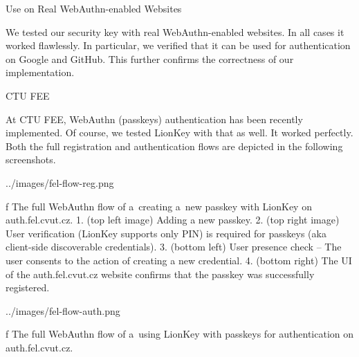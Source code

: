 \sec Use on Real WebAuthn-enabled Websites

We tested our security key with real WebAuthn-enabled websites. In all cases it worked flawlessly. In particular, we verified that it can be used for authentication on {\sbf Google} and {\sbf GitHub}. This further confirms the correctness of our implementation.


\secc CTU FEE

At CTU FEE, WebAuthn (passkeys) authentication has been recently implemented. Of course, we tested LionKey with that as well. It worked perfectly. Both the full registration and authentication flows are depicted in the following screenshots.

\midinsert
{}
\picw=144mm \cinspic ../images/fel-flow-reg.png
\caption/f The full WebAuthn flow of a~creating a~new passkey with LionKey on auth.fel.cvut.cz. 1. (top left image) Adding a new passkey. 2. (top right image) User verification (LionKey supports only PIN) is required for passkeys (aka client-side discoverable credentials). 3. (bottom left) User presence check – The user consents to the action of creating a new credential. 4. (bottom right) The UI of the auth.fel.cvut.cz website confirms that the passkey was successfully registered.
\endinsert


\midinsert
{}
\picw=144mm \cinspic ../images/fel-flow-auth.png
\caption/f The full WebAuthn flow of a~using LionKey with passkeys for authentication on auth.fel.cvut.cz.
\endinsert
